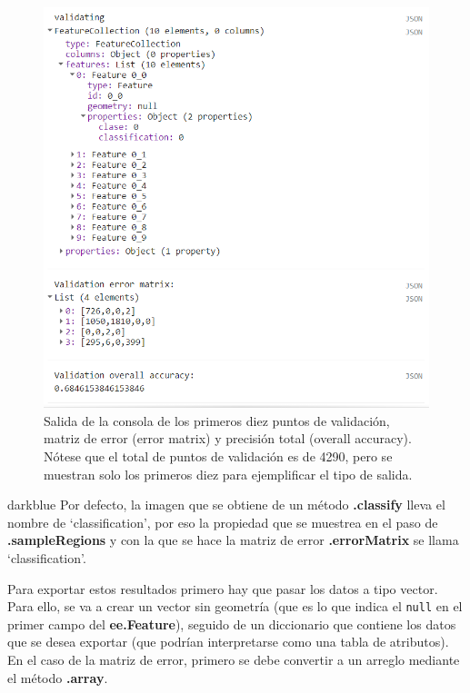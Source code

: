 \documentclass[
  12pt,
  letterpaper,
  twoside]{book}
\newcommand\boldpurple[1]{\textcolor{darkpurple}{\textbf{#1}}}
\begin{document}
\begin{figure}[H]

{\centering \includegraphics[width=0.8\linewidth]{Img/matrizError} 

}

\caption{Salida de la consola de los primeros diez puntos de validación, matriz de error (error matrix) y precisión total (overall accuracy). Nótese que el total de puntos de validación es de 4290, pero se muestran solo los primeros diez para ejemplificar el tipo de salida.}\label{fig:fc125}
\end{figure}

\begin{bluebox2}

\begin{awesomeblock}{5pt}{\faLightbulb}{darkblue}
Por defecto, la imagen que se obtiene de un método \boldpurple{.classify} lleva el nombre de `classification', por eso la propiedad que se muestrea en el paso de \boldpurple{.sampleRegions} y con la que se hace la matriz de error \boldpurple{.errorMatrix} se llama `classification'.

\end{awesomeblock}

\end{bluebox2}

Para exportar estos resultados primero hay que pasar los datos a tipo vector. Para ello, se va a crear un vector sin geometría (que es lo que indica el \texttt{null} en el primer campo del \boldpurple{ee.Feature}), seguido de un diccionario que contiene los datos que se desea exportar (que podrían interpretarse como una tabla de atributos). En el caso de la matriz de error, primero se debe convertir a un arreglo mediante el método \boldpurple{.array}.
\end{document}
